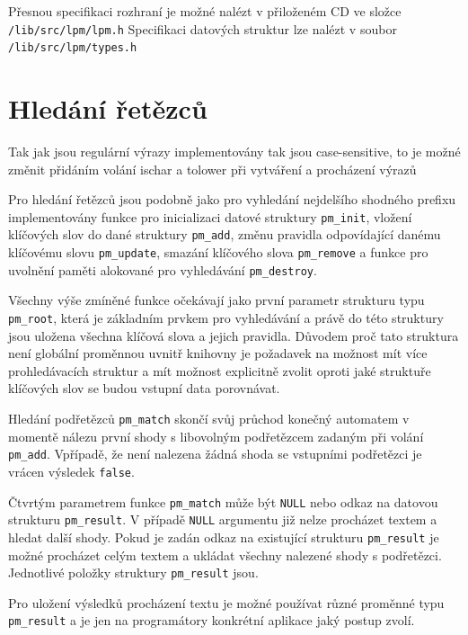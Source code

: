 Přesnou specifikaci rozhraní je možné nalézt v přiloženém CD ve složce \texttt{/lib/src/lpm/lpm.h}
Specifikaci datových struktur lze nalézt v soubor \texttt{/lib/src/lpm/types.h}


\section{Hledání řetězců} %

Tak jak jsou regulární výrazy implementovány tak jsou case-sensitive, to je možné změnit
přidáním volání ischar a tolower při vytváření a procházení výrazů

Pro hledání řetězců jsou podobně jako pro vyhledání nejdelšího shodného prefixu implementovány
funkce pro inicializaci datové struktury \texttt{pm\_init}, vložení klíčových slov do
dané struktury \texttt{pm\_add}, změnu pravidla odpovídající danému klíčovému slovu
\texttt{pm\_update}, smazání klíčového slova \texttt{pm\_remove} a funkce pro uvolnění
paměti alokované pro vyhledávání \texttt{pm\_destroy}.

Všechny výše zmíněné funkce očekávají jako první parametr strukturu typu \texttt{pm\_root},
která je základním prvkem pro vyhledávání a právě do této struktury
jsou uložena všechna klíčová slova a jejich pravidla. Důvodem proč tato struktura není globální
proměnnou uvnitř knihovny je požadavek na možnost mít více prohledávacích struktur
a mít možnost explicitně zvolit oproti jaké struktuře klíčových slov se budou vstupní data porovnávat.

Hledání podřetězců \texttt{pm\_match} skončí svůj průchod konečný automatem v momentě nálezu první shody
s libovolným podřetězcem zadaným při volání \texttt{pm\_add}. Vpřípadě, že není nalezena žádná shoda
se vstupními podřetězci je vrácen výsledek \texttt{false}.

Čtvrtým parametrem funkce \texttt{pm\_match} může být \texttt{NULL} nebo odkaz na datovou strukturu
\texttt{pm\_result}. V případě \texttt{NULL} argumentu již nelze procházet textem a hledat další shody.
Pokud je zadán odkaz na existující strukturu \texttt{pm\_result} je možné procházet celým textem a ukládat
všechny nalezené shody s podřetězci. Jednotlivé položky struktury \texttt{pm\_result} jsou.

Pro uložení výsledků procházení textu je možné používat různé proměnné typu \texttt{pm\_result}
a je jen na programátory konkrétní aplikace jaký postup zvolí.

